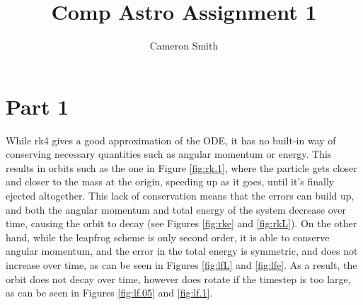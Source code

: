 \documentclass{article}
\title{Comp Astro Assignment 1}
\author{Cameron Smith }
\begin{document}
\maketitle

\section*{Part 1}

While rk4 gives a good approximation of the ODE, it has no built-in way of
conserving necessary quantities such as angular momentum or energy. This results
in orbits such as the one in Figure \ref{fig:rk.1}, where the particle
gets closer and closer to the mass at the origin, speeding up as it goes, until
it's finally ejected altogether. This lack of conservation means that the errors
can build up, and both the angular momentum and total energy of the system
decrease over time, causing the orbit to decay (see Figures \ref{fig:rke}
and \ref{fig:rkL}). On the other hand, while the leapfrog scheme is only second
order, it is able to conserve angular momentum, and the error in the total
energy is symmetric, and does not increase over time, as can be seen
in Figures \ref{fig:lfL} and \ref{fig:lfe}. As a result, the orbit does not
decay over time, however does rotate if the timestep is too large, as can be
seen in Figures \ref{fig:lf.05} and \ref{fig:lf.1}.
\end{document}
